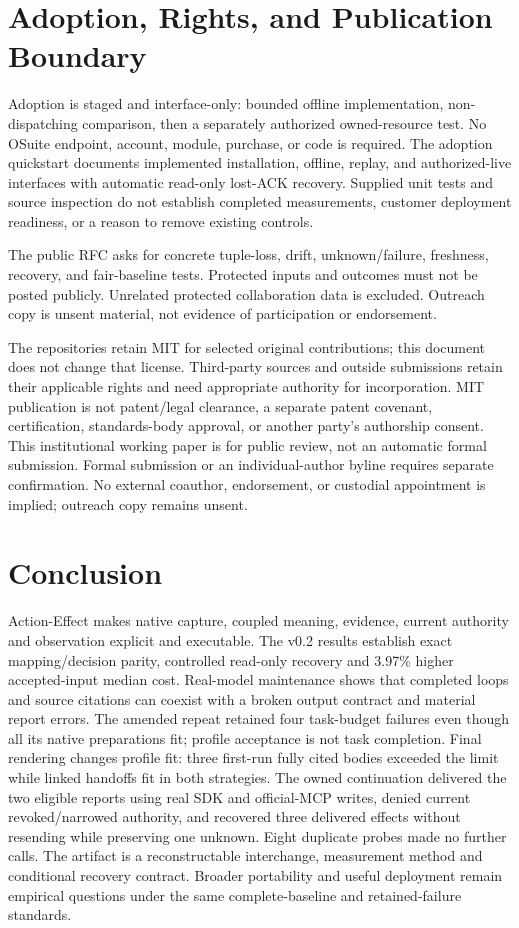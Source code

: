 \documentclass[11pt,letterpaper]{article}
\begin{document}
\section{Adoption, Rights, and Publication Boundary}

Adoption is staged and interface-only: bounded offline implementation,
non-dispatching comparison, then a separately authorized owned-resource test.
No OSuite endpoint, account, module, purchase, or code is required. The adoption
quickstart documents implemented installation, offline, replay, and authorized-live
interfaces with automatic read-only lost-ACK recovery. Supplied unit tests and
source inspection do not establish completed measurements, customer deployment
readiness, or a reason to remove existing controls.

The public RFC asks for concrete tuple-loss, drift, unknown/failure, freshness,
recovery, and fair-baseline tests. Protected inputs and outcomes must not be
posted publicly. Unrelated protected collaboration data is excluded. Outreach
copy is unsent material, not evidence of participation or endorsement.

The repositories retain MIT for selected original contributions; this document
does not change that license. Third-party sources and outside submissions retain
their applicable rights and need appropriate authority for incorporation. MIT
publication is not patent/legal clearance, a separate patent covenant,
certification, standards-body approval, or another party's authorship consent.
This institutional working paper is for public review, not an automatic formal
submission. Formal submission or an individual-author byline requires separate
confirmation. No external coauthor, endorsement, or custodial appointment is
implied; outreach copy remains unsent.

\section{Conclusion}

Action-Effect makes native capture, coupled meaning, evidence, current authority
and observation explicit and executable. The v0.2 results establish exact
mapping/decision parity, controlled read-only recovery and 3.97\% higher
accepted-input median cost. Real-model maintenance shows that completed loops
and source citations can coexist with a broken output contract and material
report errors. The amended repeat retained four task-budget failures even though
all its native preparations fit; profile acceptance is not task completion.
Final rendering changes profile fit: three first-run fully cited bodies
exceeded the limit while linked handoffs fit in both strategies. The owned
continuation delivered the two eligible reports using real SDK and official-MCP
writes, denied current revoked/narrowed authority, and recovered three delivered
effects without resending while preserving one unknown. Eight duplicate probes
made no further calls. The artifact
is a reconstructable interchange, measurement method and conditional recovery
contract. Broader portability and useful deployment remain empirical questions
under the same complete-baseline and retained-failure standards.
\end{document}
